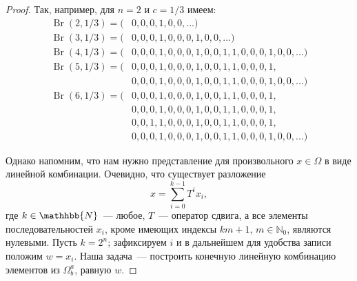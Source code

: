 \begin{proof}
	Так, например, для $n=2$ и $c=1/3$ имеем:
	\begin{equation*}
		\begin{array}{ll}
			\operatorname{Br}(2,1/3) = (&0,0,0,1,0,0,...)
			\\
			\operatorname{Br}(3,1/3) = (&0,0,0,1,0,0,0,1,0,0,...)
			\\
			\operatorname{Br}(4,1/3) = (&0,0,0,1, 0,0,0,1,   0,0,1,1, 0,0,0,1,  0,0,...)
			\\
			\operatorname{Br}(5,1/3) = (&
			                             0,0,0,1, 0,0,0,1,   0,0,1,1, 0,0,0,1,\\
			                           & 0,0,0,1, 0,0,0,1,   0,0,1,1, 0,0,0,1,
			0,0,...)
			\\
			\operatorname{Br}(6,1/3) = (&
			                             0,0,0,1, 0,0,0,1,   0,0,1,1, 0,0,0,1,\\
			                           & 0,0,0,1, 0,0,0,1,   0,0,1,1, 0,0,0,1,\\
			                           & 0,0,1,1, 0,0,0,1,   0,0,1,1, 0,0,0,1,\\
			                           & 0,0,0,1, 0,0,0,1,   0,0,1,1, 0,0,0,1,
			0,0,...)
		\end{array}
	\end{equation*}

	Однако напомним, что нам нужно представление для произвольного $x\in\Omega$ в виде линейной комбинации.
	Очевидно, что существует разложение
	\begin{equation}
		x = \sum_{i=0}^{k-1} T^i x_i
		,
	\end{equation}
	где $k\in\mathhbb{N}$~--- любое, $T$~--- оператор сдвига, а все элементы последовательностей $x_i$,
	кроме имеющих индексы $km+1$, $m\in\mathbb{N}_0$, являются нулевыми.
	Пусть $k=2^n$; зафиксируем $i$ и в дальнейшем для удобства записи положим $w=x_i$.
	Наша задача~--- построить конечную линейную комбинацию элементов из $\Omega^a_b$, равную $w$.


\end{proof}

